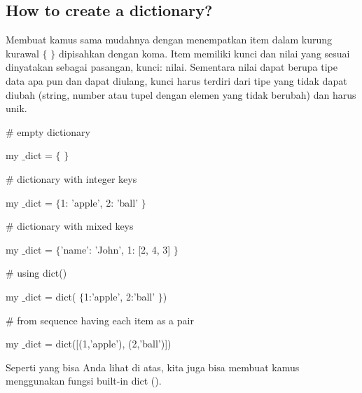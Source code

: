 \documentclass[a4paper,12pt]{report}
\begin{document}
\subsection*{How to create a dictionary?}
 \par
\noindent 
Membuat kamus sama mudahnya dengan menempatkan item dalam kurung kurawal  $  \{  $ $  \}  $ dipisahkan dengan koma. Item memiliki kunci dan nilai yang sesuai dinyatakan sebagai pasangan, kunci: nilai. Sementara nilai dapat berupa tipe data apa pun dan dapat diulang, kunci harus terdiri dari tipe yang tidak dapat diubah (string, number atau tupel dengan elemen yang tidak berubah) dan harus unik. \par
\noindent 
{\fontsize{11pt}{11pt}\selectfont  \hspace*{0.5in}  $  \#  $ empty dictionary} \par
\noindent 
{\fontsize{11pt}{11pt}\selectfont  \hspace*{0.5in} my $  \_  $dict =  $  \{  $ $  \}  $} \par
\vspace{11pt}
\noindent 
{\fontsize{11pt}{11pt}\selectfont  \hspace*{0.5in}  $  \#  $ dictionary with integer keys} \par
\noindent 
{\fontsize{11pt}{11pt}\selectfont  \hspace*{0.5in} my $  \_  $dict =  $  \{  $1: 'apple', 2: 'ball' $  \}  $} \par
\vspace{11pt}
\noindent 
{\fontsize{11pt}{11pt}\selectfont  \hspace*{0.5in}  $  \#  $ dictionary with mixed keys} \par
\noindent 
{\fontsize{11pt}{11pt}\selectfont  \hspace*{0.5in} my $  \_  $dict =  $  \{  $'name': 'John', 1: [2, 4, 3] $  \}  $} \par
\vspace{11pt}
\noindent 
{\fontsize{11pt}{11pt}\selectfont  \hspace*{0.5in}  $  \#  $ using dict()} \par
\noindent 
{\fontsize{11pt}{11pt}\selectfont  \hspace*{0.5in} my $  \_  $dict = dict( $  \{  $1:'apple', 2:'ball' $  \}  $)} \par
\vspace{11pt}
\noindent 
{\fontsize{11pt}{11pt}\selectfont  \hspace*{0.5in}  $  \#  $ from sequence having each item as a pair} \par
\noindent 
{\fontsize{11pt}{11pt}\selectfont  \hspace*{0.5in} my $  \_  $dict = dict([(1,'apple'), (2,'ball')])} \par
\noindent 
Seperti yang bisa Anda lihat di atas, kita juga bisa membuat kamus menggunakan fungsi built-in dict (). \par
\noindent 
\end{document}
